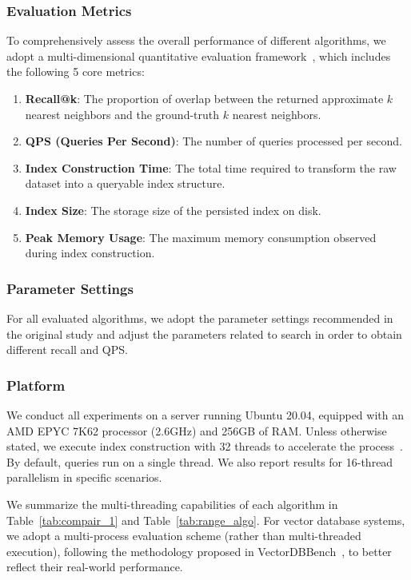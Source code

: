 \documentclass[sigconf, nonacm]{acmart}
\begin{document}
\subsubsection{Evaluation Metrics}

To comprehensively assess the overall performance of different algorithms, we adopt a multi-dimensional quantitative evaluation framework~\cite{compare}, which includes the following 5 core metrics:

\begin{enumerate}

    \item \textbf{Recall@k}: The proportion of overlap between the returned approximate $k$ nearest neighbors and the ground-truth $k$ nearest neighbors.
    \item \textbf{QPS (Queries Per Second)}: The number of queries processed per second.
    \item \textbf{Index Construction Time}: The total time required to transform the raw dataset into a queryable index structure.
    \item \textbf{Index Size}: The storage size of the persisted index on disk.
    \item \textbf{Peak Memory Usage}: The maximum memory consumption observed during index construction.
\end{enumerate}

\subsubsection{Parameter Settings}

For all evaluated algorithms, we adopt the parameter settings recommended in the original study and adjust the parameters related to search in order to obtain different recall and QPS.



\subsubsection{Platform}


We conduct all experiments on a server running Ubuntu 20.04, equipped with an AMD EPYC 7K62 processor (2.6GHz) and 256GB of RAM. Unless otherwise stated, we execute index construction with 32 threads to accelerate the process~\cite{benchmarkindex}. By default, queries run on a single thread. We also report results for 16-thread parallelism in specific scenarios.

We summarize the multi-threading capabilities of each algorithm in Table~\ref{tab:compair_1} and Table~\ref{tab:range_algo}. For vector database systems, we adopt a multi-process evaluation scheme (rather than multi-threaded execution), following the methodology proposed in VectorDBBench~\cite{VectorDBBench}, to better reflect their real-world performance.
\end{document}

